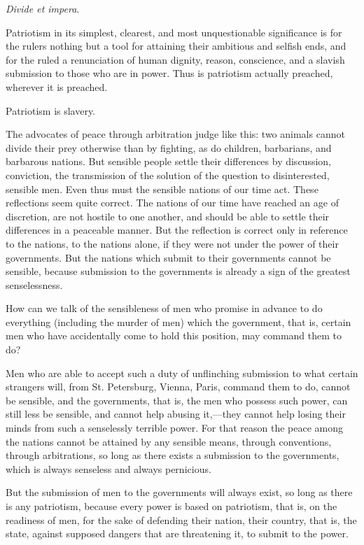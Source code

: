 \documentclass{book}
\begin{document}
\emph{Divide et impera}.

Patriotism in its simplest, clearest, and most unquestionable significance is for the rulers nothing but a tool for attaining their ambitious and selfish ends, and for the ruled a renunciation of human dignity, reason, conscience, and a slavish submission to those who are in power. Thus is patriotism actually preached, wherever it is preached.

Patriotism is slavery.

The advocates of peace through arbitration judge like this: two animals cannot divide their prey otherwise than by fighting, as do children, barbarians, and barbarous nations. But sensible people settle their differences by discussion, conviction, the transmission of the solution of the question to disinterested, sensible men. Even thus must the sensible nations of our time act. These reflections seem quite correct. The nations of our time have reached an age of discretion, are not hostile to one another, and should be able to settle their differences in a peaceable manner. But the reflection is correct only in reference to the nations, to the nations alone, if they were not under the power of their governments. But the nations which submit to their governments cannot be sensible, because submission to the governments is already a sign of the greatest senselessness.

How can we talk of the sensibleness of men who promise in advance to do everything (including the murder of men) which the government, that is, certain men who have accidentally come to hold this position, may command them to do?

Men who are able to accept such a duty of unflinching submission to what certain strangers will, from St. Petersburg, Vienna, Paris, command them to do, cannot be sensible, and the governments, that is, the men who possess such power, can still less be sensible, and cannot help abusing it,—they cannot help losing their minds from such a senselessly terrible power. For that reason the peace among the nations cannot be attained by any sensible means, through conventions, through arbitrations, so long as there exists a submission to the governments, which is always senseless and always pernicious.

But the submission of men to the governments will always exist, so long as there is any patriotism, because every power is based on patriotism, that is, on the readiness of men, for the sake of defending their nation, their country, that is, the state, against supposed dangers that are threatening it, to submit to the power.
\end{document}

